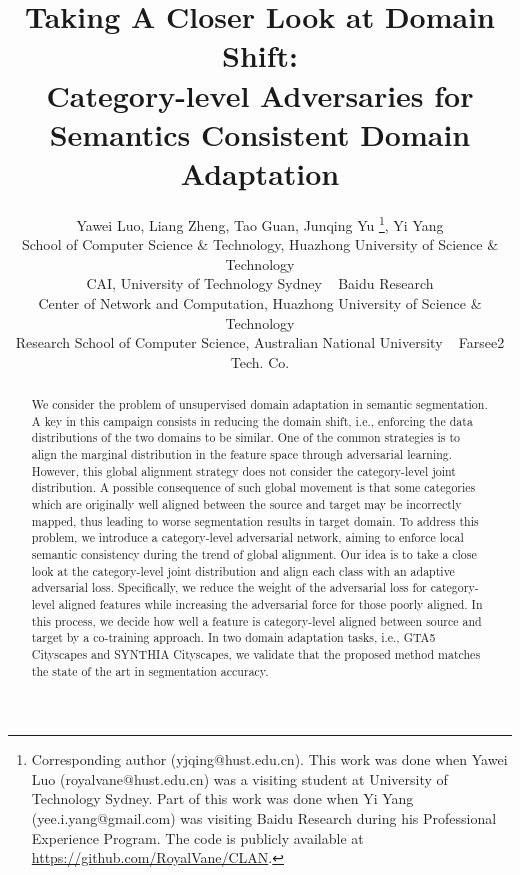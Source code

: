 \documentclass[10pt,twocolumn,letterpaper]{article}
\begin{document}
\title{Taking A Closer Look at Domain Shift: \\ Category-level Adversaries for Semantics Consistent Domain Adaptation}

\author{Yawei Luo,\hspace{2mm} Liang Zheng,\hspace{2mm} Tao Guan,\hspace{2mm} Junqing Yu \thanks{Corresponding author (yjqing@hust.edu.cn). 
\newline \hspace*{0.16in} This work was done when Yawei Luo (royalvane@hust.edu.cn) was a visiting student at University of Technology Sydney. Part of this work was done when Yi Yang (yee.i.yang@gmail.com) was visiting Baidu Research during his Professional Experience Program. The code is publicly available at \url{https://github.com/RoyalVane/CLAN}. 
},\hspace{2mm} Yi Yang \vspace{0.5cm} \\ 
School of Computer Science \& Technology, Huazhong University of Science \& Technology\\
CAI, University of Technology Sydney ~ Baidu Research\\ 
Center of Network and Computation, Huazhong University of Science \& Technology \\
Research School of Computer Science, Australian National University ~ Farsee2 Tech. Co.
}

\maketitle
\vspace{-0.2cm}
\begin{abstract}
   We consider the problem of unsupervised domain adaptation in semantic segmentation. A key in this campaign consists in reducing the domain shift, i.e., enforcing the data distributions of the two domains to be similar. One of the common strategies is to align the marginal distribution in the feature space through adversarial learning. However, this global alignment strategy does not consider the category-level joint distribution. A possible consequence of such global movement is that some categories which are originally well aligned between the source and target may be incorrectly mapped, thus leading to worse segmentation results in target domain. To address this problem, we introduce a category-level adversarial network, aiming to enforce local semantic consistency during the trend of global alignment. Our idea is to take a close look at the category-level joint distribution and align each class with an adaptive adversarial loss. Specifically, we reduce the weight of the adversarial loss for category-level aligned features while increasing the adversarial force for those poorly aligned. In this process, we decide how well a feature is category-level aligned between source and target by a co-training approach. In two domain adaptation tasks, i.e., GTA5  Cityscapes and SYNTHIA  Cityscapes, we validate that the proposed method matches the state of the art in segmentation accuracy. 
\end{abstract}
\vspace{-0.6cm}
\end{document}
